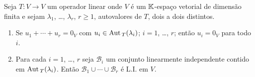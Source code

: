 \begin{teorema}
    Seja $T : V \to V$ um operador linear onde $V$ \'e um $\mathbb{K}$-espa\c{c}o vetorial de dimens\~ao finita e sejam $\lambda_1$, \dots, $\lambda_r$, $r \ge 1$, autovalores de $T$, dois a dois distintos.
    \begin{enumerate}[label={\roman*})]
        \item\label{autovetorLI} Se $u_1 + \cdots + u_r = 0_V$ com $u_i \in {\rm Aut\,}_T(\lambda_i)$; $i = 1$, \dots, $r$; ent\~ao $u_i = 0_V$ para todo $i$.
        \item Para cada $i = 1$, \dots, $r$ seja $\mathcal{B}_i$ um conjunto linearmente independente contido em ${\rm Aut\,}_T(\lambda_i)$. Ent\~ao $\mathcal{B}_1 \cup \cdots \cup \mathcal{B}_r$ \'e L.I. em $V$.
    \end{enumerate}
\end{teorema}
